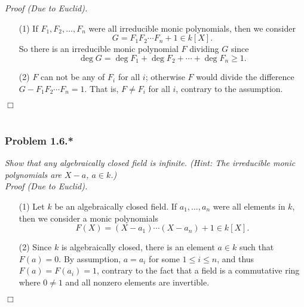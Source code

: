 \documentclass{article}
\begin{document}
\emph{Proof (Due to Euclid).}
\begin{enumerate}
\item[(1)]
  If
  $F_1, F_2, \ldots, F_n$ were all irreducible monic polynomials, then
  we consider
  \[
    G = F_1 F_2 \cdots F_n + 1 \in k[X].
  \]
  So there is an irreducible monic polynomial $F$ dividing $G$
  since
  \[
    \deg G = \deg F_1 + \deg F_2 + \cdots + \deg F_n \geq 1.
  \]

\item[(2)]
  $F$ can not be any of $F_i$ for all $i$;
  otherwise $F$ would divide the difference $G - F_1 F_2 \cdots F_n = 1$.
  That is, $F \neq F_i$ for all $i$, contrary to the assumption.
\end{enumerate}
$\Box$\\\\






\subsubsection*{Problem 1.6.*}
\emph{Show that any algebraically closed field is infinite.
(Hint: The irreducible monic polynomials are $X - a$, $a \in k$.)} \\

\emph{Proof (Due to Euclid).}
\begin{enumerate}
\item[(1)]
  Let $k$ be an algebraically closed field.
  If $a_1, \ldots, a_n$ were all elements in $k$, then
  we consider a monic polynomials
  \[
    F(X) = (X - a_1) \cdots (X - a_n) + 1 \in k[X].
  \]

\item[(2)]
  Since $k$ is algebraically closed,
  there is an element $a \in k$ such that $F(a) = 0$.
  By assumption, $a = a_i$ for some $1 \leq i \leq n$,
  and thus $F(a) = F(a_i) = 1$, contrary to the fact that
  a field is a commutative ring where $0 \neq 1$ and all nonzero elements are invertible.
\end{enumerate}
$\Box$\\\\



\end{document}
